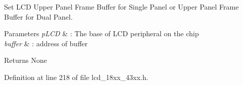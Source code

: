 Set L\+CD Upper Panel Frame Buffer for Single Panel or Upper Panel Frame Buffer for Dual Panel. 


\begin{DoxyParams}{Parameters}
{\em p\+L\+CD} & \+: The base of L\+CD peripheral on the chip \\
\hline
{\em buffer} & \+: address of buffer \\
\hline
\end{DoxyParams}
\begin{DoxyReturn}{Returns}
None 
\end{DoxyReturn}


Definition at line 218 of file lcd\+\_\+18xx\+\_\+43xx.\+h.

